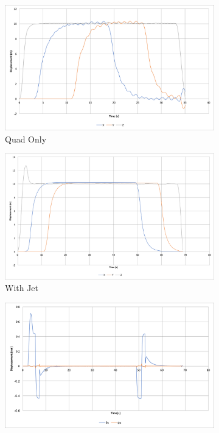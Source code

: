\documentclass[11pt]{article}
\begin{document}
\begin{figure}[p]
    \begin{subfigure}{0.48\textwidth}
        \includegraphics[width=\linewidth]{square_path_quad_only}
        \caption{Quad Only}
        \label{fig:square_path_quad_only}
    \end{subfigure}\hspace*{\fill}
    \begin{subfigure}{0.48\textwidth}
        \includegraphics[width=\linewidth]{square_path_w_jet}
        \caption{With Jet}
        \label{fig:square_path_w_jet}
    \end{subfigure}
    \medskip
    \begin{subfigure}{0.48\textwidth}
        \includegraphics[width=\linewidth]{square_path_w_jet_angle}

\end{subfigure}
\end{figure}
\end{document}
